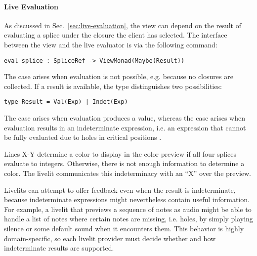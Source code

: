 \paragraph{Live Evaluation}
\label{sec:live-evaluation-def}
As discussed in Sec.~\ref{sec:live-evaluation}, 
the view can depend on the result of evaluating a splice 
under the closure the client has selected.
The interface between the view and the live evaluator 
is via the 
following command:
\begin{lstlisting}[numbers=none,xleftmargin=0cm]
eval_splice : SpliceRef -> ViewMonad(Maybe(Result))
\end{lstlisting}


The  case 
arises when evaluation is not possible, e.g. because no closures are collected.
If a result is available, the  type distinguishes two possibilities:
\begin{lstlisting}[numbers=none]
type Result = Val(Exp) | Indet(Exp)
\end{lstlisting}
The  case arises when evaluation produces a value, whereas the 
 case arises when evaluation results in an indeterminate expression,
i.e. an expression that cannot be fully evaluated due to holes 
in critical positions \cite{HazelnutLive}.

Lines X-Y determine a color to display in the color preview 
if all four splices evaluate to integers. Otherwise, there is not 
enough information to determine a color. The livelit 
communicates this indeterminacy with an ``X'' over the preview.

Livelits can attempt to offer feedback even when the result is indeterminate,
because indeterminate expressions might nevertheless contain useful information.
For example, a livelit that previews a sequence of notes as audio might be able 
to handle a list of notes where certain notes are missing, i.e. holes, by 
simply playing silence or some default sound when it encounters them.
This behavior is highly domain-specific, so each livelit provider must decide 
whether and how indeterminate results are supported.

